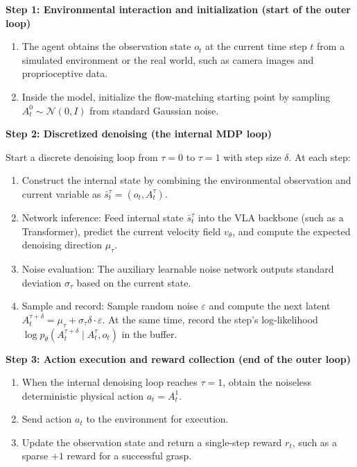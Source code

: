\textbf{Step 1: Environmental interaction and initialization (start of the outer loop)}

\begin{enumerate}
\def\labelenumi{\arabic{enumi}.}
\tightlist
\item
  The agent obtains the observation state \(o_t\) at the current time step \(t\) from a simulated environment or the real world, such as camera images and proprioceptive data.
\item
  Inside the model, initialize the flow-matching starting point by sampling \(A_t^0\sim\mathcal{N}(0,I)\) from standard Gaussian noise.
\end{enumerate}

\textbf{Step 2: Discretized denoising (the internal MDP loop)}

Start a discrete denoising loop from \(\tau=0\) to \(\tau=1\) with step size \(\delta\). At each step:

\begin{enumerate}
\def\labelenumi{\arabic{enumi}.}
\tightlist
\item
  Construct the internal state by combining the environmental observation and current variable as \(\bar{s}_t^\tau=(o_t,A_t^\tau)\).
\item
  Network inference: Feed internal state \(\bar{s}_t^\tau\) into the VLA backbone (such as a Transformer), predict the current velocity field \(v_\theta\), and compute the expected denoising direction \(\mu_\tau\).
\item
  Noise evaluation: The auxiliary learnable noise network outputs standard deviation \(\sigma_\tau\) based on the current state.
\item
  Sample and record: Sample random noise \(\varepsilon\) and compute the next latent \(A_t^{\tau+\delta}=\mu_\tau+\sigma_\tau\delta\cdot\varepsilon\). At the same time, record the step's log-likelihood \(\log p_\theta(A_t^{\tau+\delta}\mid A_t^\tau,o_t)\) in the buffer.
\end{enumerate}

\textbf{Step 3: Action execution and reward collection (end of the outer loop)}

\begin{enumerate}
\def\labelenumi{\arabic{enumi}.}
\tightlist
\item
  When the internal denoising loop reaches \(\tau=1\), obtain the noiseless deterministic physical action \(a_t=A_t^1\).
\item
  Send action \(a_t\) to the environment for execution.
\item
  Update the observation state and return a single-step reward \(r_t\), such as a sparse \(+1\) reward for a successful grasp.
\end{enumerate}

